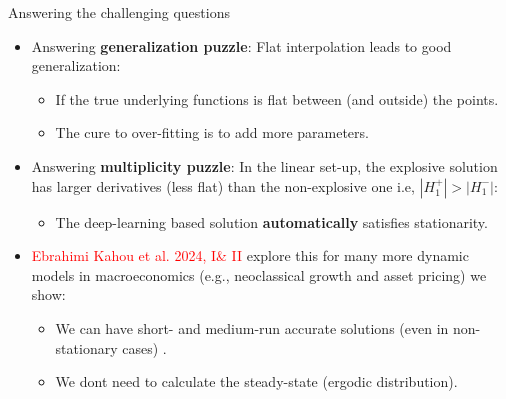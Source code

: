 \documentclass[aspectratio=169,10pt]{beamer}
\newcommand{\emphcolor}[1]{\textbf{\textcolor{emphcolorval}{#1}}}
\begin{document}


\begin{frame}{Answering the challenging questions}
	\begin{itemize}
		\item Answering \emphcolor{generalization puzzle}: Flat  interpolation leads to good generalization:\vspace{0.1in}
		\begin{itemize}
			\item If the true underlying functions is flat between (and outside) the points.\vspace{0.1in}
			\item The cure to over-fitting is to add more parameters.\vspace{0.1in}
		\end{itemize}
	 \item Answering \emphcolor{multiplicity puzzle}: In the linear set-up, the explosive solution has larger derivatives (less flat) than the non-explosive one i.e, $|H_1^+| > |H_1^-|$:\vspace{0.1in}
	 \begin{itemize}
	 	\item The deep-learning based solution \emphcolor{automatically} satisfies stationarity. \vspace{0.1in}
	 \end{itemize}
	\item \textcolor{red}{Ebrahimi Kahou et al. 2024, I\& II} explore this for many more dynamic models in macroeconomics (e.g., neoclassical growth and asset pricing) we show: \vspace{0.1in}
	\begin{itemize}
		\item We can have short- and medium-run accurate solutions (even in non-stationary cases) .\vspace{0.1in}
		\item  We dont need to calculate the steady-state (ergodic distribution).
	\end{itemize} 	
	\end{itemize}
	
\end{frame}				
\end{document}
